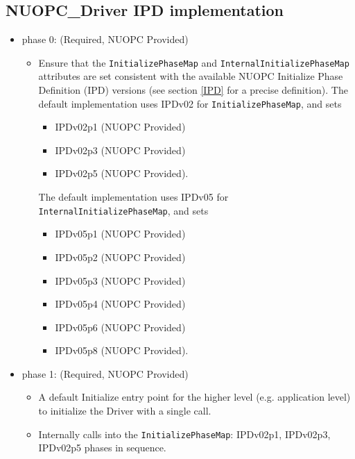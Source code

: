 \subsection{NUOPC\_Driver IPD implementation}
\begin{itemize}
\item phase 0: ({\sc Required, NUOPC Provided})
  \begin{itemize}
  \item Ensure that the {\tt InitializePhaseMap} and {\tt InternalInitializePhaseMap} attributes are set consistent with the available NUOPC Initialize Phase Definition (IPD) versions (see section \ref{IPD} for a precise definition). The default implementation uses IPDv02 for {\tt InitializePhaseMap}, and sets
    \begin{itemize}
    \item IPDv02p1  ({\sc NUOPC Provided})
    \item IPDv02p3  ({\sc NUOPC Provided})
    \item IPDv02p5  ({\sc NUOPC Provided}).
    \end{itemize}  
 The default implementation uses IPDv05 for {\tt InternalInitializePhaseMap}, and sets
    \begin{itemize}
    \item IPDv05p1  ({\sc NUOPC Provided})
    \item IPDv05p2  ({\sc NUOPC Provided})
    \item IPDv05p3  ({\sc NUOPC Provided})
    \item IPDv05p4  ({\sc NUOPC Provided})
    \item IPDv05p6  ({\sc NUOPC Provided})
    \item IPDv05p8  ({\sc NUOPC Provided}).
    \end{itemize}    
  \end{itemize}  
\item phase 1: ({\sc Required, NUOPC Provided})
  \begin{itemize}
    \item A default Initialize entry point for the higher level (e.g. application level) to initialize the Driver with a single call.
    \item Internally calls into the  {\tt InitializePhaseMap}: IPDv02p1, IPDv02p3, IPDv02p5 phases in sequence.
  \end{itemize}  


\end{itemize}

